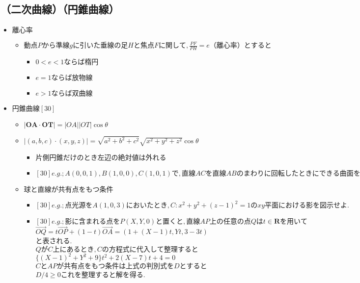 \documentclass[dvipdfmx,uplatex]{jsarticle}
\begin{document}
\subsection{（二次曲線）（円錐曲線）}
\begin{itemize}
	\item $ 離心率$
	\begin{itemize}
		\item $ 動点Pから準線gに引いた垂線の足Hと焦点Fに関して,\frac{PF}{PH} = e（離心率）とすると$
		\begin{itemize}
			\item $ 0 < e < 1ならば楕円$
			\item $ e = 1 ならば放物線$
			\item $ e > 1 ならば双曲線  $
		\end{itemize}
	\end{itemize}
	\item $ 円錐曲線[30]$
	\begin{itemize}
		\item $ |\bm{OA} \cdot \bm{OT}| = |OA||OT| \cos \theta$
		\item $ |(a,b,c) \cdot (x,y,z)| = \sqrt{a^2+b^2+c^2} \sqrt{x^2+y^2+z^2} \cos \theta$
		\begin{itemize}
			\item $ 片側円錐だけのとき左辺の絶対値は外れる$
			\item $ [30]e.g.;A(0,0,1),B(1,0,0),C(1,0,1)で,直線ACを直線ABのまわりに回転したときにできる曲面をE,直線ABを直線ACのまわりに回転したときにできる曲面をE'とする．それぞれのz=0での切り口は?$
		\end{itemize}
		\item $ 球と直線が共有点をもつ条件$
		\begin{itemize}
			\item $ [30]e.g.;点光源をA(1,0,3)においたとき,C:x^2+y^2+(z-1)^2=1のxy平面における影を図示せよ.$
			\item $ [30]e.g.;影に含まれる点をP(X,Y,0)と置くと,直線AP上の任意の点Qはt \in \bm{R}を用いて$ \\ $ \vec{OQ}= t \vec{OP} + (1-t) \vec{OA} =(1+(X-1)t,Yt,3-3t)$ \\ と表される. \\ $ QがC上にあるとき,Cの方程式に代入して整理すると$ \\ $ \{ (X-1)^2+Y^2+9 \} t^2+2(X-7)t+4=0$ \\ $ CとAPが共有点をもつ条件は上式の判別式をDとすると$ \\ $ D/4 \geq 0$これを整理すると解を得る.
		\end{itemize}

\end{itemize}
\end{itemize}
\end{document}
